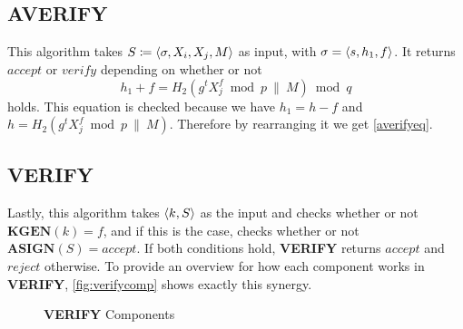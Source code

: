 \subsection{\textbf{AVERIFY}}
  This algorithm takes \(S \coloneqq \langle \sigma, X_i, X_j, M \rangle\) as input, with \(\sigma=\langle s,h_1, f \rangle\).
  It returns \(accept\) or \(verify\) depending on whether or not 
    \begin{equation}
      h_1 + f = H_2(g^t X_j^f \bmod p ~\|~ M) \bmod q \label{averifyeq}
    \end{equation}
  holds. 
  This equation is checked because we have \(h_1 = h - f\) and \(h = H_2(g^t X_j^f \bmod p ~\|~ M)\).
  Therefore by rearranging it we get \autoref{averifyeq}.

\subsection{\textbf{VERIFY}}
  Lastly, this algorithm takes \(\langle k,S \rangle\) as the input and checks whether or not \(\textbf{KGEN}(k) = f\), and if this is the case, checks whether or not \(\textbf{ASIGN}(S)=accept\).
  If both conditions hold, \textbf{VERIFY} returns \(accept\) and \(reject\) otherwise.
  To provide an overview for how each component works in \textbf{VERIFY}, \autoref{fig:verifycomp} shows exactly this synergy.

  \begin{figure}[htbp]
    
    \begin{center}
    \end{center}
    
    \caption{\textbf{VERIFY} Components}
    \label{fig:verifycomp}
  \end{figure}
